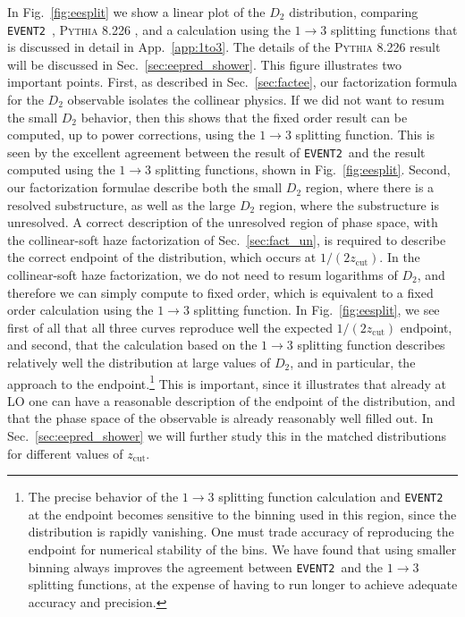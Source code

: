 \documentclass[a4paper,11pt]{article}
\newcommand{\eventtwo}{\texttt{EVENT2}}
\def\zcut{z_{\text{cut}}}
\DeclareRobustCommand{\Sec}[1]{Sec.~\ref{#1}}
\DeclareRobustCommand{\App}[1]{App.~\ref{#1}}
\DeclareRobustCommand{\Fig}[1]{Fig.~\ref{#1}}
\newcommand{\pythia}[1]{\textsc{Pythia\xspace #1}}
\begin{document}
In \Fig{fig:eesplit}  we show a linear plot of the $D_2$ distribution, comparing \eventtwo~\cite{Catani:1996vz},  \pythia{8.226} \cite{Sjostrand:2006za,Sjostrand:2014zea}, and a calculation using the $1\to 3$ splitting functions that is discussed in detail in \App{app:1to3}. The details of the \pythia{8.226} result will be discussed in \Sec{sec:eepred_shower}. This figure illustrates two important points. First, as described in \Sec{sec:factee}, our factorization formula for the $D_2$ observable isolates the collinear physics. If we did not want to resum the small $D_2$ behavior, then this shows that the fixed order result can be computed, up to power corrections, using the $1\to 3$ splitting function. This is seen by the excellent agreement between the result of  \eventtwo~and the result computed using the $1\to3$ splitting functions, shown in \Fig{fig:eesplit}. Second, our factorization formulae describe both the small $D_2$ region, where there is a resolved substructure, as well as the large $D_2$ region, where the substructure is unresolved. A correct description of the unresolved region of phase space, with the collinear-soft haze factorization of \Sec{sec:fact_un}, is required to describe the correct endpoint of the distribution, which occurs at $1/(2\zcut)$. In the collinear-soft haze factorization, we do not need to resum logarithms of $D_2$, and therefore we can simply compute to fixed order, which is equivalent to a fixed order calculation using the $1\to 3$ splitting function. In \Fig{fig:eesplit}, we see first of all that all three curves reproduce well the expected $1/(2\zcut)$ endpoint, and second, that the calculation based on the $1\to 3$ splitting function describes relatively well the distribution at large values of $D_2$, and in particular, the approach to the endpoint.\footnote{The precise behavior of the $1\rightarrow 3$ splitting function calculation and \eventtwo$\,$  at the endpoint becomes sensitive to the binning used in this region, since the distribution is rapidly vanishing. One must trade accuracy of reproducing the endpoint for numerical stability of the bins. We have found that using smaller binning always improves the agreement between \eventtwo~and the $1\to 3$ splitting functions, at the expense of having to run longer to achieve adequate accuracy and precision.} This is important, since it illustrates that already at LO one can have a reasonable description of the endpoint of the distribution, and that the phase space of the observable is already reasonably well filled out. In \Sec{sec:eepred_shower} we will further study this in the matched distributions for different values of $\zcut$.
\end{document}
